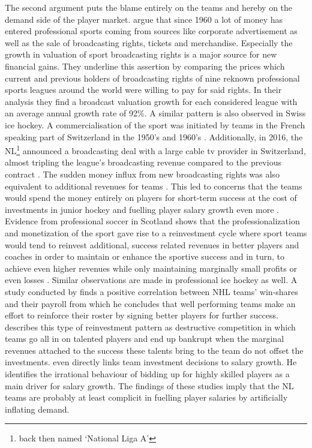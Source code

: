 \documentclass[12pt, a4paper]{article}
\begin{document}
\noindent
The second argument puts the blame entirely on the teams and hereby on the demand side of the player market. \citet{andon_accounting_2019} argue that since 1960 a lot of money has entered professional sports coming from sources like corporate advertisement as well as the sale of broadcasting rights, tickets and merchandise. Especially the growth in valuation of sport broadcasting rights is a major source for new financial gains. They underline this assertion by comparing the prices which current and previous holders of broadcasting rights of nine reknown professional sports leagues around the world were willing to pay for said rights. In their analysis they find a broadcast valuation growth for each considered league with an average annual growth rate of 92\%. A similar pattern is also observed in Swiss ice hockey. A commercialisation of the sport was initiated by teams in the French speaking part of Switzerland in the 1950’s and 1960’s \citep{koller_kanadier_2016}. Additionally, in 2016, the NL\footnote{back then named ‘National Liga A’} announced a broadcasting deal with a large cable tv provider in Switzerland, almost tripling the league's broadcasting revenue compared to the previous contract \citep[see][]{germann_354_2016}. The sudden money influx from new broadcasting rights was also equivalent to additional revenues for teams \citep[see][]{noauthor_noch_2017}. This led to concerns that the teams would spend the money entirely on players for short-term success at the cost of investments in junior hockey and fuelling player salary growth even more \citep[see][]{germann_schweizer_2018,kuchta_schone_2017}. Evidence from professional soccer in Scotland shows that the professionalization and monetization of the sport gave rise to a reinvestment cycle where sport teams would tend to reinvest additional, success related revenues in better players and coaches in order to maintain or enhance the sportive success and in turn, to achieve even higher revenues while only maintaining marginally small profits or even losses \citep{cooper_insolvency_2013}. Similar observations are made in professional ice hockey as well. A study conducted by \citet{zimbalist_competitive_2002} finds a positive correlation between NHL teams' win-shares and their payroll from which he concludes that well performing teams make an effort to reinforce their roster by signing better players for further success. \citet{whitney_bidding_1993} describes this type of reinvestment pattern as destructive competition in which teams go all in on talented players and end up bankrupt when the marginal revenues attached to the success these talents bring to the team do not offset the investments. \citet{kesenne_impact_2000} even directly links team investment decisions to salary growth. He identifies the irrational behaviour of bidding up for highly skilled players as a main driver for salary growth. The findings of these studies imply that the NL teams are probably at least complicit in fuelling player salaries by artificially inflating demand. 
\end{document}
